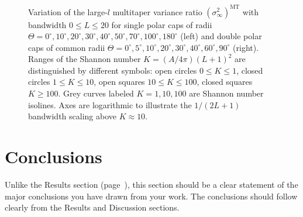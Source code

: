 \documentclass[11pt]{report}
\newcommand{\MT}{^{\mathrm{MT}}}
\newcommand{\Lpot}{(L+1)^2}
\begin{document}
\begin{figure}
\centering 
{} 
\caption[Variance ratio of multitaper estimates]{Variation of the large-$l$ multitaper variance ratio $(\sigma_{\infty}^2)\MT$ with bandwidth $0\leq L\leq 20$ for single polar caps of radii $\Theta=0^{\circ},10^{\circ},20^{\circ}, 30^{\circ},40^{\circ},50^{\circ},70^{\circ},100^{\circ},180^{\circ}$ (left) and double polar caps of common radii $\Theta=0^{\circ}, 5^{\circ}, 10^{\circ}, 20^{\circ},30^{\circ},40^{\circ},60^{\circ},90^{\circ}$ (right). Ranges of the Shannon number $K=(A/4\pi)\Lpot$ are distinguished by different symbols: open circles $0\leq K\leq 1$, closed circles $1\leq K\leq 10$, open squares $10\leq K\leq 100$, closed squares $K\geq 100$. Grey curves labeled \mbox{$K=1,10,100$} are Shannon number  isolines. Axes are logarithmic to illustrate the $1/(2L+1)$ bandwidth scaling above $K\approx 10$. \label{MTvarfig2}}
\end{figure}

\section{Conclusions \label{sec:conclusions}}
Unlike the Results section (page~\pageref{sec:results}), this section should be a clear statement of the major conclusions you have drawn from your work. The conclusions should follow clearly from the Results and Discussion sections.

\small
\renewcommand{\bibsep}{0em}

\renewcommand{\bibname}{References}


\end{document}
